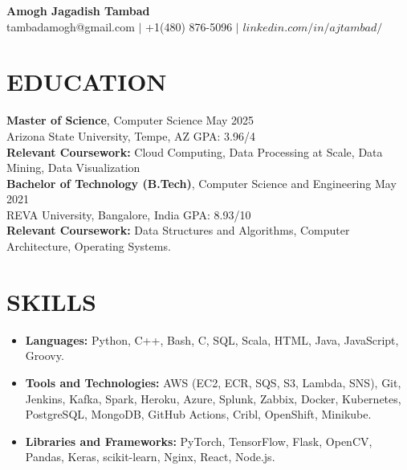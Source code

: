 \documentclass[a4paper,9pt]{extarticle}
\begin{document}
\pagestyle{empty}

\begin{center}
\textbf{\huge Amogh Jagadish Tambad}\\[2pt] %
tambadamogh@gmail.com \hspace{1mm} $|$ \hspace{1mm} +1(480) 876-5096  \hspace{1mm} $|$ \hspace{1mm} $linkedin.com/in/ajtambad/$ \hspace{1mm}
\end{center}

\section*{EDUCATION}
\noindent
\textbf{Master of Science}, Computer Science \hfill May 2025 \\ %
Arizona State University, Tempe, AZ
\hfill GPA: 3.96/4\\ %
\textbf{Relevant Coursework:} Cloud Computing, Data Processing at Scale, Data Mining, Data Visualization\\

\noindent
\textbf{Bachelor of Technology (B.Tech)}, Computer Science and Engineering \hfill May 2021 \\ %
REVA University, Bangalore, India \hfill GPA: 8.93/10\\ %
\textbf{Relevant Coursework:} Data Structures and Algorithms, Computer Architecture, Operating Systems.

\section*{SKILLS}
\begin{itemize}
    \item \textbf{Languages:} Python, C++, Bash, C, SQL, Scala, HTML, Java, JavaScript, Groovy. %
    \item \textbf{Tools and Technologies:} AWS (EC2, ECR, SQS, S3, Lambda, SNS), Git, Jenkins, Kafka, Spark, Heroku, Azure, Splunk, Zabbix, Docker, Kubernetes, PostgreSQL, MongoDB, GitHub Actions, Cribl, OpenShift, Minikube. %
    \item \textbf{Libraries and Frameworks:} PyTorch, TensorFlow, Flask, OpenCV, Pandas, Keras, scikit-learn, Nginx, React, Node.js.
\end{itemize}
\end{document}
